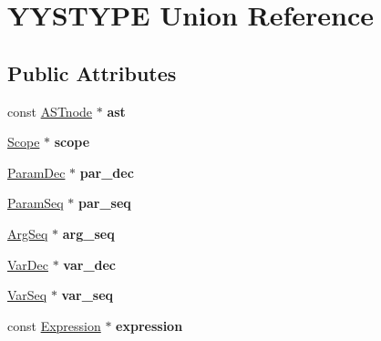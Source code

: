 \hypertarget{union_y_y_s_t_y_p_e}{}\section{Y\+Y\+S\+T\+Y\+PE Union Reference}
\label{union_y_y_s_t_y_p_e}
\subsection*{Public Attributes}
\begin{DoxyCompactItemize}
\item 
\mbox{\label{union_y_y_s_t_y_p_e_a778d76bb998ec04647b59dc4f84e4a56}} 
const \hyperlink{class_a_s_tnode}{A\+S\+Tnode} $\ast$ {\bfseries ast}
\item 
\mbox{\label{union_y_y_s_t_y_p_e_ad7df710a3b0ec2941de5517ebb79eefc}} 
\hyperlink{class_scope}{Scope} $\ast$ {\bfseries scope}
\item 
\mbox{\label{union_y_y_s_t_y_p_e_acc8ac22a66d86927f507d0894136865a}} 
\hyperlink{class_param_dec}{Param\+Dec} $\ast$ {\bfseries par\+\_\+dec}
\item 
\mbox{\label{union_y_y_s_t_y_p_e_a9e2ec228e56d6bf901820fdf9bc63c89}} 
\hyperlink{class_param_seq}{Param\+Seq} $\ast$ {\bfseries par\+\_\+seq}
\item 
\mbox{\label{union_y_y_s_t_y_p_e_ad95e9a1c0e72429a6790de8a9c12508b}} 
\hyperlink{class_arg_seq}{Arg\+Seq} $\ast$ {\bfseries arg\+\_\+seq}
\item 
\mbox{\label{union_y_y_s_t_y_p_e_a71aa26f8f6bd1b239d40b8fa089492a2}} 
\hyperlink{class_var_dec}{Var\+Dec} $\ast$ {\bfseries var\+\_\+dec}
\item 
\mbox{\label{union_y_y_s_t_y_p_e_a71753ca94bd18ddd2de885fe0688b190}} 
\hyperlink{class_var_seq}{Var\+Seq} $\ast$ {\bfseries var\+\_\+seq}
\item 
\mbox{\label{union_y_y_s_t_y_p_e_a4bea199471379902fe0a89cfdff31b1e}} 
const \hyperlink{class_expression}{Expression} $\ast$ {\bfseries expression}
\item 

\end{DoxyCompactItemize}
